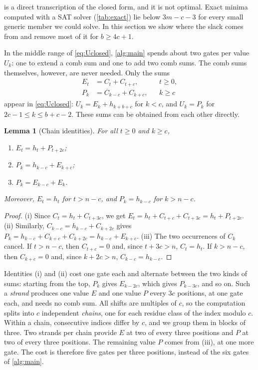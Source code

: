 \documentclass{ieeeaccess}
\theoremstyle{plain}
\newtheorem{lemma}[theorem]{Lemma}
\theoremstyle{definition}
\begin{document}
 is a direct transcription of the closed form, and it is not
optimal. Exact minima computed with a SAT solver (\cref{tab:exact}) lie below
$3m-c-3$ for every small generic member we could solve. In this section we show
where the slack comes from and remove most of it for $b\ge4c+1$.

In the middle range of \eqref{eq:Uclosed}, \cref{alg:main} spends about two
gates per value $U_k$: one to extend a comb sum and one to add two comb sums.
The comb sums themselves, however, are never needed. Only the sums
\begin{align*}
  E_t&=C_t+C_{t+c}, && t\ge0,\\
  P_k&=C_{k-c}+C_{k+c}, && k\ge c
\end{align*}
appear in \eqref{eq:Uclosed}: $U_k=E_k+h_{k+b+c}$ for $k<c$, and $U_k=P_k$ for
$2c-1\le k\le b+c-2$. These sums can be obtained from each other directly.

\begin{lemma}[Chain identities]\label{lem:chain}
For all $t\ge0$ and $k\ge c$,
\begin{enumerate}[label=(\roman*),itemsep=1pt]
  \item $E_t=h_t+P_{t+2c}$;
  \item $P_k=h_{k-c}+E_{k+c}$;
  \item $P_k=E_{k-c}+E_k$.
\end{enumerate}
Moreover, $E_t=h_t$ for $t>n-c$, and $P_k=h_{k-c}$ for $k>n-c$.
\end{lemma}

\begin{proof}
(i) Since $C_t=h_t+C_{t+3c}$, we get
$E_t=h_t+C_{t+c}+C_{t+3c}=h_t+P_{t+2c}$.
(ii) Similarly, $C_{k-c}=h_{k-c}+C_{k+2c}$ gives
$P_k=h_{k-c}+C_{k+c}+C_{k+2c}=h_{k-c}+E_{k+c}$.
(iii) The two occurrences of $C_k$ cancel.
If $t>n-c$, then $C_{t+c}=0$ and, since $t+3c>n$, $C_t=h_t$. If $k>n-c$, then
$C_{k+c}=0$ and, since $k+2c>n$, $C_{k-c}=h_{k-c}$.
\end{proof}

Identities (i) and (ii) cost one gate each and alternate between the two kinds
of sums: starting from the top, $P_k$ gives $E_{k-2c}$, which gives
$P_{k-3c}$, and so on. Such a \emph{strand} produces one value $E$ and one value
$P$ every $3c$ positions, at one gate each, and needs no comb sum. All shifts
are multiples of $c$, so the computation splits into $c$ independent
\emph{chains}, one for each residue class of the index modulo $c$. Within a
chain, consecutive indices differ by $c$, and we group them in blocks of three.
Two strands per chain provide $E$ at two of every three positions and $P$ at two
of every three positions. The remaining value $P$ comes from (iii), at one more
gate. The cost is therefore five gates per three positions, instead of the six
gates of \cref{alg:main}.
\end{document}
